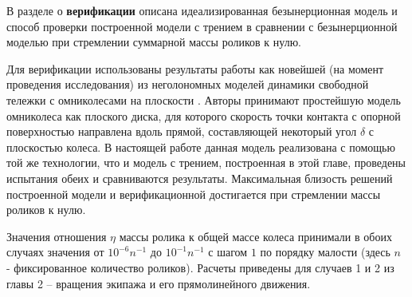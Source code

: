 
В разделе о \textbf{верификации} описана идеализированная безынерционная модель и способ проверки построенной модели с трением в сравнении с безынерционной моделью при стремлении суммарной массы роликов к нулю.

Для верификации использованы результаты работы \cite{Borisov2011} как новейшей (на момент проведения исследования) из неголономных моделей динамики свободной тележки с омниколесами на плоскости \cite{Borisov2011, formalskii, ZobovaTatarinovPMM}. Авторы \cite{Borisov2011} принимают простейшую модель омниколеса как плоского диска, для которого скорость точки контакта с опорной поверхностью направлена вдоль прямой, составляющей некоторый угол $\delta$ с плоскостью колеса.
В настоящей работе данная модель реализована с помощью той же технологии, что и модель с трением, построенная в этой главе, проведены испытания обеих и сравниваются результаты.
Максимальная близость решений построенной модели и верификационной достигается при стремлении массы роликов к нулю.

Значения отношения $\eta$ массы ролика к общей массе колеса принимали в обоих случаях значения от $10^{-6}n^{-1}$ до $10^{-1}n^{-1}$ с шагом $1$ по порядку малости (здесь $n$ - фиксированное количество роликов).
Расчеты приведены для случаев 1 и 2 из главы 2 -- вращения экипажа и его прямолинейного движения.

